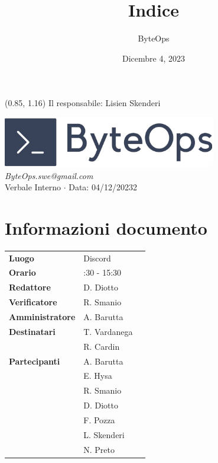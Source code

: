 \documentclass{article}
\title{\textbf{\fontsize{28}{6}\selectfont Indice}}
\author{\fontsize{14}{6}\selectfont ByteOps}
\date{Dicembre 4, 2023}
\begin{document}
\begin{textblock*}{\textwidth}(0.85\textwidth, 1.16\textheight)
    Il responsabile: Lisien Skenderi
\end{textblock*}

\pagestyle{fancy}
\begin{center}
\includegraphics[width = 0.7\textwidth]{../../Images/logo.png} \\
\vspace{0.2cm}
\textcolor[RGB]{60, 60, 60}{\textit{ByteOps.swe@gmail.com}} \\
\vspace{1cm}
\fontsize{16}{6}\selectfont Verbale Interno $\cdot$ Data: 04/12/20232 \\
\vspace{0.5cm}
\end{center}

\section*{Informazioni documento}
\def\arraystretch{1.2}
\begin{tabular}{>{\raggedleft\arraybackslash}p{}|>{\raggedright\arraybackslash}p{}c}
\hline
\addlinespace
\textbf{Luogo} & Discord \vspace{10pt} \\
\textbf{Orario} & 14:30 - 15:30 \vspace{10pt} \\
\textbf{Redattore} & D. Diotto \vspace{10pt} \\
\textbf{Verificatore} & R. Smanio \vspace{10pt} \\
\textbf{Amministratore} & A. Barutta \vspace{10pt} \\
\textbf{Destinatari} & T. Vardanega \\ & R. Cardin \vspace{10pt} \\
\textbf{Partecipanti} & A. Barutta \\ & E. Hysa \\ & R. Smanio \\ & D. Diotto \\ & F. Pozza \\ & L. Skenderi \\ & N. Preto \vspace{10pt} \\
\end{tabular}
\pagebreak 
\end{document}
